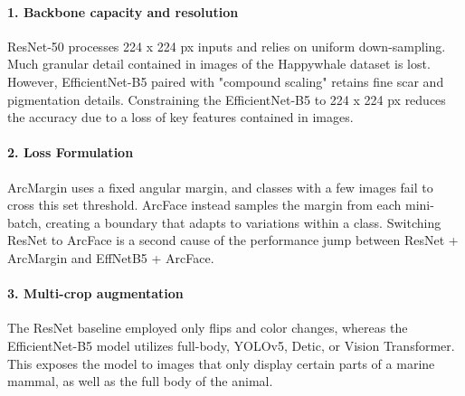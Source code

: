 \documentclass[twocolumn]{article}
\begin{document}
\begin{table}[H]
\centering
{}
\caption{Comparison of model strategy components contributing to performance.}
\label{tab:model_strategy_comparison}
\end{table}


\paragraph{1. Backbone capacity and resolution}

ResNet-50 processes 224 x 224 px inputs and relies on uniform down-sampling. Much granular detail contained in images of the Happywhale dataset is lost. However, EfficientNet-B5 paired with "compound scaling" retains fine scar and pigmentation details. Constraining the EfficientNet-B5 to 224 x 224 px reduces the accuracy due to a loss of key features contained in images. 

\paragraph{2. Loss Formulation}

ArcMargin uses a fixed angular margin, and classes with a few images fail to cross this set threshold. ArcFace instead samples the margin from each mini-batch, creating a boundary that adapts to variations within a class. Switching ResNet to ArcFace is a second cause of the performance jump between ResNet + ArcMargin and EffNetB5 + ArcFace.

\paragraph{3. Multi-crop augmentation}

The ResNet baseline employed only flips and color changes, whereas the EfficientNet-B5 model utilizes full-body, YOLOv5, Detic, or Vision Transformer. This exposes the model to images that only display certain parts of a marine mammal, as well as the full body of the animal. 
\end{document}
